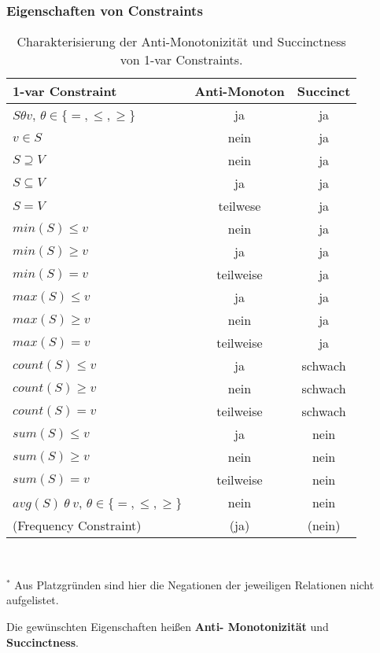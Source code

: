 \subsubsection{Eigenschaften von Constraints}
\begin{table}[!ht]
  \centering
  \caption{Charakterisierung der Anti-Monotonizität und Succinctness von
	1-var Constraints.}
  \label{tab:var_con}
\begin{tabular}{lcc}
	\toprule
	1-var Constraint & Anti-Monoton & Succinct\\
	\midrule
	\(S\theta v\), \(\theta\in\{=,\leq,\geq\}\) & ja & ja\\
	\(v\in S\) & nein & ja\\
	\(S\supseteq V\) & nein & ja\\
	\(S\subseteq V\) & ja & ja\\
	\(S = V\) & teilwese & ja\\
	\midrule
	\(min(S)\leq v\) & nein & ja\\
	\(min(S)\geq v\) & ja & ja\\
	\(min(S) = v\) & teilweise & ja\\
	\midrule
	\(max(S)\leq v\) & ja & ja\\
	\(max(S)\geq v\) & nein & ja\\
	\(max(S) = v\) & teilweise & ja\\
	\midrule
	\(count(S)\leq v\) & ja & schwach\\
	\(count(S)\geq v\) & nein & schwach\\
	\(count(S) = v\) & teilweise & schwach\\
	\midrule
	\(sum(S)\leq v\) & ja & nein\\
	\(sum(S)\geq v\) & nein & nein\\
	\(sum(S) = v\) & teilweise & nein\\
	\midrule
	\(avg(S)\ \theta\ v\), \(\theta\in\{=, \leq, \geq\}\) & nein & nein\\
	\midrule
	(Frequency Constraint) & (ja) & (nein)\\
	\bottomrule
\end{tabular}
	\\
	\vspace{10pt}
	{\raggedright \(^*\) Aus Platzgründen sind hier die Negationen der 
	jeweiligen Relationen nicht aufgelistet.\\}
\end{table}

Die gewünschten Eigenschaften heißen \textbf{Anti-
Monotonizität} und \textbf{Succinctness}.

